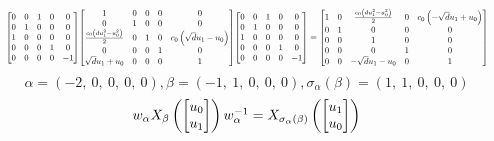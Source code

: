 \documentclass[11pt]{article}
\theoremstyle{definition}
\begin{document}
\[
\scaletoalign{\textwidth}{{\left[\begin{matrix}0 & 0 & 1 & 0 & 0\\0 & 1 & 0 & 0 & 0\\1 & 0 & 0 & 0 & 0\\0 & 0 & 0 & 1 & 0\\0 & 0 & 0 & 0 & -1\end{matrix}\right]} {\left[\begin{matrix}1 & 0 & 0 & 0 & 0\\0 & 1 & 0 & 0 & 0\\\frac{c_{0} \left(d u_{1}^{2} - u_{0}^{2}\right)}{2} & 0 & 1 & 0 & c_{0} \left(\sqrt{d} u_{1} - u_{0}\right)\\0 & 0 & 0 & 1 & 0\\\sqrt{d} u_{1} + u_{0} & 0 & 0 & 0 & 1\end{matrix}\right]} {\left[\begin{matrix}0 & 0 & 1 & 0 & 0\\0 & 1 & 0 & 0 & 0\\1 & 0 & 0 & 0 & 0\\0 & 0 & 0 & 1 & 0\\0 & 0 & 0 & 0 & -1\end{matrix}\right]} = {\left[\begin{matrix}1 & 0 & \frac{c_{0} \left(d u_{1}^{2} - u_{0}^{2}\right)}{2} & 0 & c_{0} \left(- \sqrt{d} u_{1} + u_{0}\right)\\0 & 1 & 0 & 0 & 0\\0 & 0 & 1 & 0 & 0\\0 & 0 & 0 & 1 & 0\\0 & 0 & - \sqrt{d} u_{1} - u_{0} & 0 & 1\end{matrix}\right]}}
\]
\[
\alpha = \left( -2, \  0, \  0, \  0, \  0\right), \beta = \left( -1, \  1, \  0, \  0, \  0\right), \sigma_{\alpha}(\beta) = \left( 1, \  1, \  0, \  0, \  0\right)
\]
\[
\scaletoalign{\textwidth}{w_{\alpha} X_{\beta}\left(\left[\begin{matrix}u_{0}\\u_{1}\end{matrix}\right]\right) w_{\alpha}^{-1} = X_{\sigma_{\alpha}\left(\beta\right)}\left(\left[\begin{matrix}u_{1}\\u_{0}\end{matrix}\right]\right)}
\]
\end{document}
